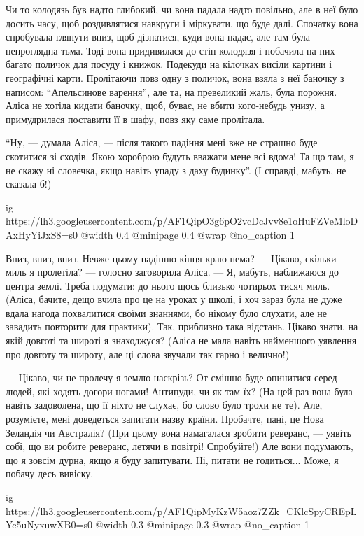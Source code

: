 Чи то колодязь був надто глибокий, чи вона падала надто повільно, але в неї
було досить часу, щоб роздивлятися навкруги і міркувати, що буде далі. Спочатку
вона спробувала глянути вниз, щоб дізнатися, куди вона падає, але там була
непроглядна тьма. Тоді вона придивилася до стін колодязя і побачила на них
багато поличок для посуду і книжок. Подекуди на кілочках висіли картини і
географічні карти. Пролітаючи повз одну з поличок, вона взяла з неї баночку з
написом: \enquote{Апельсинове варення}, але та, на превеликий жаль, була порожня. Аліса
не хотіла кидати баночку, щоб, буває, не вбити кого-небудь унизу, а
примудрилася поставити її в шафу, повз яку саме пролітала.

\enquote{Ну, — думала Аліса, — після такого падіння мені вже не страшно буде скотитися
зі сходів. Якою хороброю будуть вважати мене всі вдома! Та що там, я не скажу
ні словечка, якщо навіть упаду з даху будинку}. (І справді, мабуть, не сказала
б!)

\ifcmt
  ig https://lh3.googleusercontent.com/p/AF1QipO3g6pO2vcDcJvv8e1oHuFZVeMloDAxHyYiJxS8=s0
  @width 0.4
  @minipage 0.4
  @wrap \parpic[r]
	@no_caption 1
\fi

Вниз, вниз, вниз. Невже цьому падінню кінця-краю нема? — Цікаво, скільки миль я
пролетіла? — голосно заговорила Аліса. — Я, мабуть, наближаюся до центра землі.
Треба подумати: до нього щось близько чотирьох тисяч миль. (Аліса, бачите, дещо
вчила про це на уроках у школі, і хоч зараз була не дуже вдала нагода
похвалитися своїми знаннями, бо нікому було слухати, але не завадить повторити
для практики). Так, приблизно така відстань. Цікаво знати, на якій довготі та
широті я знаходжуся? (Аліса не мала навіть найменшого уявлення про довготу та
широту, але ці слова звучали так гарно і велично!)

— Цікаво, чи не пролечу я землю наскрізь? От смішно буде опинитися серед людей,
які ходять догори ногами! Антипуди, чи як там їх? (На цей раз вона була навіть
задоволена, що її ніхто не слухає, бо слово було трохи не те). Але, розумієте,
мені доведеться запитати назву країни. Пробачте, пані, це Нова Зеландія чи
Австралія? (При цьому вона намагалася зробити реверанс, — уявіть собі, що ви
робите реверанс, летячи в повітрі! Спробуйте!) Але вони подумають, що я зовсім
дурна, якщо я буду запитувати. Ні, питати не годиться... Може, я побачу десь
вивіску.

\ifcmt
  ig https://lh3.googleusercontent.com/p/AF1QipMyKzW5aoz7ZZk_CKlcSpyCREpLYc5uNyxuwXB0=s0
  @width 0.3
  @minipage 0.3
  @wrap \parpic[r]
	@no_caption 1
\fi

